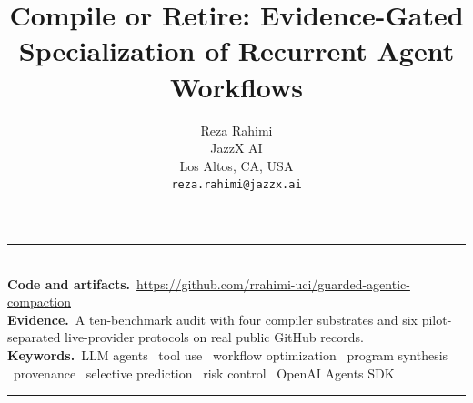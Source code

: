 \documentclass{article}
\title{Compile or Retire: Evidence-Gated Specialization of Recurrent Agent Workflows}
\author{Reza Rahimi \\
JazzX AI \\
Los Altos, CA, USA \\
\texttt{reza.rahimi@jazzx.ai}}
\theoremstyle{plain}
\theoremstyle{definition}
\begin{document}
\maketitle


\begin{abstract}

\end{abstract}

\noindent\rule{\textwidth}{0.4pt}\\[0.8mm]
{\small\textbf{Code and artifacts.}\ \url{https://github.com/rrahimi-uci/guarded-agentic-compaction}\\
\textbf{Evidence.}\ A ten-benchmark audit with four compiler substrates and six
pilot-separated live-provider protocols on real public GitHub records.\\
\textbf{Keywords.}\ LLM agents \textperiodcentered\ tool use \textperiodcentered\
workflow optimization \textperiodcentered\ program synthesis \textperiodcentered\
provenance \textperiodcentered\ selective prediction \textperiodcentered\ risk
control \textperiodcentered\ OpenAI Agents SDK}\\[-1mm]
\rule{\textwidth}{0.4pt}





\end{document}
